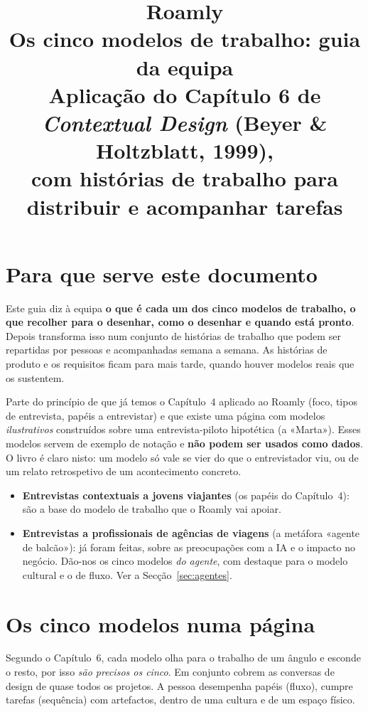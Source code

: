 \documentclass[11pt,a4paper]{article}
\title{\textbf{Roamly}\\[4pt]\large Os cinco modelos de trabalho: guia da equipa\\
\normalsize Aplicação do Capítulo 6 de \textit{Contextual Design} (Beyer \& Holtzblatt, 1999),\\
com histórias de trabalho para distribuir e acompanhar tarefas}
\author{}
\date{}
\begin{document}
\maketitle
\tableofcontents

\section{Para que serve este documento}

Este guia diz à equipa \textbf{o que é cada um dos cinco modelos de trabalho, o que recolher para o desenhar, como o desenhar e quando está pronto}. Depois transforma isso num conjunto de histórias de trabalho que podem ser repartidas por pessoas e acompanhadas semana a semana. As histórias de produto e os requisitos ficam para mais tarde, quando houver modelos reais que os sustentem.

Parte do princípio de que já temos o Capítulo~4 aplicado ao Roamly (foco, tipos de entrevista, papéis a entrevistar) e que existe uma página com modelos \emph{ilustrativos} construídos sobre uma entrevista-piloto hipotética (a «Marta»). Esses modelos servem de exemplo de notação e \textbf{não podem ser usados como dados}. O livro é claro nisto: um modelo só vale se vier do que o entrevistador viu, ou de um relato retrospetivo de um acontecimento concreto.

\begin{nota}
\begin{itemize}
  \item \textbf{Entrevistas contextuais a jovens viajantes} (os papéis do Capítulo~4): são a base do modelo de trabalho que o Roamly vai apoiar.
  \item \textbf{Entrevistas a profissionais de agências de viagens} (a metáfora «agente de balcão»): já foram feitas, sobre as preocupações com a IA e o impacto no negócio. Dão-nos os cinco modelos \emph{do agente}, com destaque para o modelo cultural e o de fluxo. Ver a Secção~\ref{sec:agentes}.
\end{itemize}
\end{nota}

\section{Os cinco modelos numa página}

Segundo o Capítulo~6, cada modelo olha para o trabalho de um ângulo e esconde o resto, por isso \emph{são precisos os cinco}. Em conjunto cobrem as conversas de design de quase todos os projetos. A pessoa desempenha papéis (fluxo), cumpre tarefas (sequência) com artefactos, dentro de uma cultura e de um espaço físico.
\end{document}
